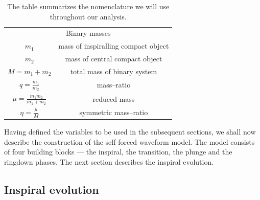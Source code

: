 \documentclass[aps,prd,showpacs,amssymb,floatfix,nofootinbib,superscriptaddress]{revtex4-1}%
\begin{document}
\begin{table}[thb]
\centering
\begin{tabular}{|c| c| }
\hline
\multicolumn{2}{|c|}{Binary masses}  \\\cline{1-2} 
\(m_1\) & mass of inspiralling compact object  \\ [0.7ex] 
\(m_2 \) & mass of central compact object  \\ [0.7ex]  
\(M=m_1+m_2 \) & total mass of binary system \\ [0.7ex]  
\(q=\frac{m_1}{m_2} \) & mass--ratio \\ [0.9ex]  
\(\mu=\frac{m_1 m_2}{m_1 + m_2} \) & reduced mass \\ [0.9ex]  
\(\eta= \frac{\mu}{M}\) & symmetric mass--ratio \\ [0.9ex]  
\hline
\end{tabular}
\caption{The table summarizes the nomenclature we will use throughout our analysis.}
\label{length}
\end{table}

Having defined the variables to be used in the subsequent sections, we shall now describe the construction of the self-forced waveform model. The model consists of four building blocks --- the inspiral, the transition, the plunge and the ringdown phases. The next section describes the inspiral evolution. 

\subsection{Inspiral evolution}
\end{document}
